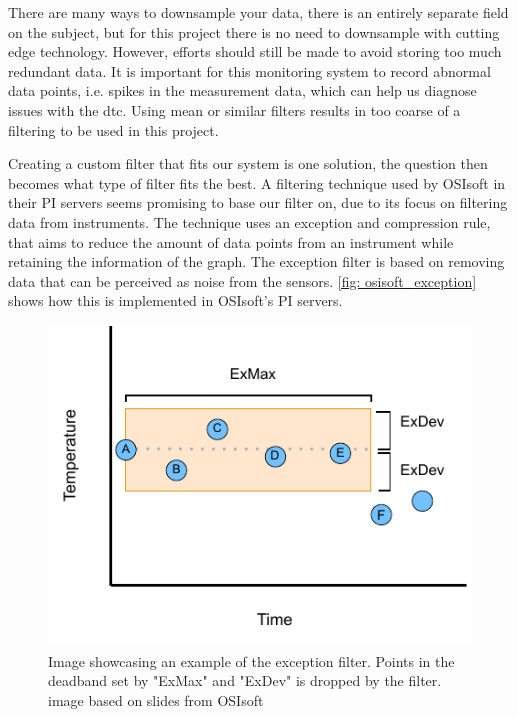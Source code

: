 \documentclass[main.tex]{subfiles}
\begin{document}
 There are many ways to downsample your data, there is an entirely separate field on the subject, but for this project there is no need to downsample with cutting edge technology. However, efforts should still be made to avoid storing too much redundant data. It is important for this monitoring system to record abnormal data points, i.e. spikes in the measurement data, which can help us diagnose issues with the \gls{dtc}. Using mean or similar filters results in too coarse of a filtering to be used in this project.
 
 Creating a custom filter that fits our system is one solution, the question then becomes what type of filter fits the best. A filtering technique used by OSIsoft in their PI servers seems promising to base our filter on, due to its focus on filtering data from instruments\cite{osisoft_exception}. The technique uses an exception and compression rule, that aims to reduce the amount of data points from an instrument while retaining the information of the graph. The exception filter is based on removing data that can be perceived as noise from the sensors. \autoref{fig: osisoft_exception} shows how this is implemented in OSIsoft's PI servers.
 
\begin{figure}[!ht]
    \centering
    \includegraphics[scale=1.3]{images/exception_process.pdf}
    \caption{Image showcasing an example of the exception filter. Points in the deadband set by "ExMax" and "ExDev" is dropped by the filter. image based on slides from OSIsoft\cite{osisoft_image}}
    \label{fig: osisoft_exception}
\end{figure}
\FloatBarrier 
 
\end{document}
